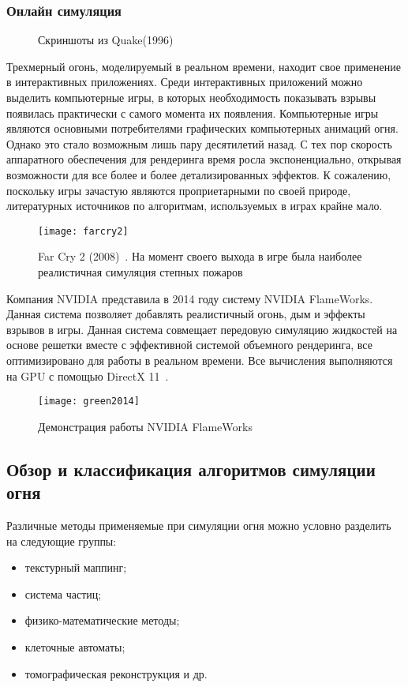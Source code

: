 \subsubsection{Онлайн симуляция}
\begin{figure}%
    \centering
    \qquad
    \caption{Скриншоты из Quake(1996) ~\cite{capstone}}%
    \label{fig:example}%
\end{figure}
Трехмерный огонь, моделируемый в реальном времени, находит свое применение в
интерактивных приложениях. Среди интерактивных приложений можно выделить
компьютерные игры, в которых необходимость показывать взрывы появилась
практически с самого момента их появления. Компьютерные игры являются основными
потребителями графических компьютерных анимаций огня. Однако это стало возможным
лишь пару десятилетий назад. С тех пор скорость аппаратного обеспечения для
рендеринга время росла экспоненциально, открывая возможности для все более и
более детализированных эффектов. К сожалению, поскольку игры зачастую являются
проприетарными по своей природе, литературных источников по алгоритмам,
используемых в играх крайне мало.
\begin{figure}[htb]
	\centering
	\texttt{[image: farcry2]}
	\caption{Far Cry 2 (2008)~\cite{farcry2}. На момент своего выхода в игре
	была наиболее реалистичная симуляция степных пожаров}
\end{figure}
Компания NVIDIA представила в 2014 году систему NVIDIA FlameWorks. Данная
система позволяет добавлять реалистичный огонь, дым и эффекты взрывов в игры.
Данная система совмещает передовую симуляцию жидкостей на основе решетки вместе
с эффективной системой объемного рендеринга, все оптимизировано для работы в
реальном времени. Все вычисления выполняются на GPU с помощью DirectX
11~\cite{Green:2014:NFR:2633956.2658828}.
\begin{figure}[htb]
	\centering
	\texttt{[image: green2014]}
	\caption{Демонстрация работы NVIDIA FlameWorks}
\end{figure}
\subsection{Обзор и классификация алгоритмов симуляции огня}
Различные методы применяемые при симуляции огня можно условно разделить на
следующие группы:
\begin{itemize}
	\item текстурный маппинг;
	\item система частиц;
	\item физико-математические методы;
	\item клеточные автоматы;
	\item томографическая реконструкция и др.
\end{itemize}

